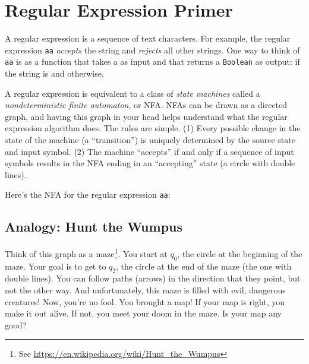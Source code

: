 \documentclass[9pt]{extbook}
\begin{document}
\section{Regular Expression Primer}

A regular expression is a sequence of text characters.  For example, the regular expression \texttt{aa} \emph{accepts} the string  and \emph{rejects} all other strings.  One way to think of \texttt{aa} is as a function that takes a  as input and that returns a \texttt{Boolean} as output:  if the string is  and  otherwise.

A regular expression is equivalent to a class of \emph{state machines} called a \emph{nondeterministic finite automaton}, or NFA.  NFAs can be drawn as a directed graph, and having this graph in your head helps understand what the regular expression algorithm does.  The rules are simple.  (1) Every possible change in the state of the machine (a ``transition'') is uniquely determined by the source state and input symbol.  (2) The machine ``accepts'' if and only if a sequence of input symbols results in the NFA ending in an ``accepting'' state (a circle with double lines).

Here's the NFA for the regular expression \texttt{aa}:

\begin{center}
\end{center}

\subsection{Analogy: Hunt the Wumpus}

Think of this graph as a maze\footnote{See \url{https://en.wikipedia.org/wiki/Hunt_the_Wumpus}}.  You start at $q_0$, the circle at the beginning of the maze.  Your goal is to get to $q_2$, the circle at the end of the maze (the one with double lines).  You can follow paths (arrows) in the direction that they point, but not the other way.  And unfortunately, this maze is filled with evil, dangerous creatures!  Now, you're no fool.  You brought a map!  If your map is right, you make it out alive.  If not, you meet your doom in the maze.  Is your map any good?
\end{document}
